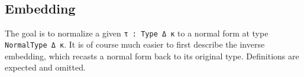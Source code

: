 \documentclass[authoryear, acmsmall, screen, review, nonacm]{acmart}
\begin{document}
\begin{code}[hide]
\>[0]\AgdaSpace{}%
\AgdaSymbol{=}\AgdaSpace{}%
\AgdaSpace{}%
\<%
\\
\>[0]\AgdaSpace{}%
\AgdaSymbol{:}\AgdaSpace{}%
\AgdaSpace{}%
\AgdaSpace{}%
\AgdaSpace{}%
\AgdaSpace{}%
\AgdaSpace{}%
\AgdaSymbol{(}\AgdaSpace{}%
\AgdaOperator{\AgdaInductiveConstructor{,,}}\AgdaSpace{}%
\AgdaSymbol{)}\AgdaSpace{}%
\<%
\\
\>[0]\AgdaSpace{}%
\AgdaSymbol{=}\AgdaSpace{}%
\AgdaSpace{}%
\<%
\\
\>[0]\AgdaSpace{}%
\AgdaSymbol{:}\AgdaSpace{}%
\AgdaSpace{}%
\AgdaSpace{}%
\AgdaOperator{\AgdaInductiveConstructor{R[}}\AgdaSpace{}%
\AgdaSpace{}%
\AgdaOperator{\AgdaInductiveConstructor{]}}\AgdaSpace{}%
\AgdaSpace{}%
\AgdaSpace{}%
\AgdaSymbol{(}\AgdaSpace{}%
\AgdaOperator{\AgdaInductiveConstructor{,,}}\AgdaSpace{}%
\AgdaSymbol{)}\AgdaSpace{}%
\AgdaOperator{\AgdaInductiveConstructor{R[}}\AgdaSpace{}%
\AgdaSpace{}%
\AgdaOperator{\AgdaInductiveConstructor{]}}\<%
\\
\>[0]\AgdaSpace{}%
\AgdaSymbol{=}\AgdaSpace{}%
\AgdaSpace{}%
\<%
\end{code}

\subsection{Embedding}

The goal is to normalize a given \verb!τ : Type Δ κ! to a normal form at type \verb!NormalType Δ κ!. It is of course much easier to first describe the inverse embedding, which recasts a normal form back to its original type. Definitions are expected and omitted. 
\end{document}
